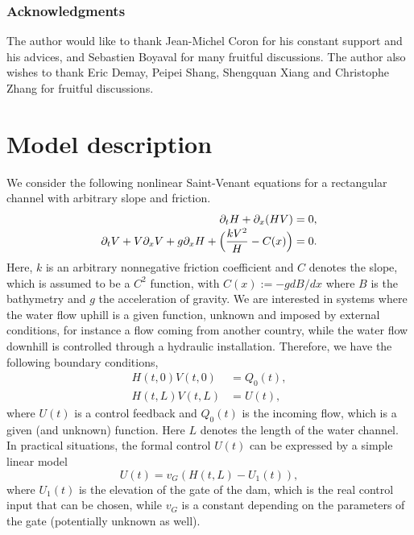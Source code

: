 \documentclass[JEP,XML,SOM,Unicode]{cedram}
\theoremstyle{definition}
\begin{document}
\subsubsection*{Acknowledgments}
The author would like to thank Jean-Michel Coron for his constant support and his advices, and Sebastien Boyaval for many fruitful discussions.
The author also wishes to thank Eric Demay, Peipei Shang, Shengquan Xiang and Christophe Zhang for fruitful discussions.

\section{Model description}
\label{s1}
We
consider
the following nonlinear Saint-Venant equations for a rectangular channel with arbitrary slope and friction.\vspace*{-3pt}
\begin{equation}
\begin{split}
\partial_{t}H+\partial_{x}(HV)&=0,\\[-3pt]
\partial_{t}V+V\partial_{x}V+g\partial_{x}H+\Bigl(\frac{kV^{2}}{H}-C(x)\Bigr)&=0.
\end{split}
\label{Stvenant}
\end{equation}
Here, $k$ is an arbitrary nonnegative friction coefficient and $C$ denotes the slope, which is assumed to be a $C^{2}$ function, with $C(x):=-gdB/dx$ where $B$ is the bathymetry and $g$ the acceleration of gravity.
We are interested in systems where the water flow uphill is a given function, unknown and imposed by external conditions, for instance a flow coming from another country, while the water flow downhill is controlled through a hydraulic installation. Therefore, we have the following boundary conditions,
\begin{equation}
\begin{split}
H(t,0)V(t,0)&=Q_{0}(t),\\
H(t,L)V(t,L)&=U(t),
\end{split}
\label{boundary02}
\end{equation}
where $U(t)$
is a control feedback and $Q_{0}(t)$
is the incoming flow, which is a given (and unknown) function. Here $L$ denotes the length of the water channel.
In practical situations, the formal control $U(t)$ can be expressed by a simple linear model \cite{BastinCoronPI}
\begin{equation}
U(t)=v_{G}(H(t,L)-U_{1}(t)),
\label{vG}
\end{equation}
where $U_{1}(t)$ is the elevation of the gate of the dam, which is the real control input that can be chosen, while $v_{G}$ is a constant depending on the parameters of the gate (potentially unknown as well).
\end{document}
